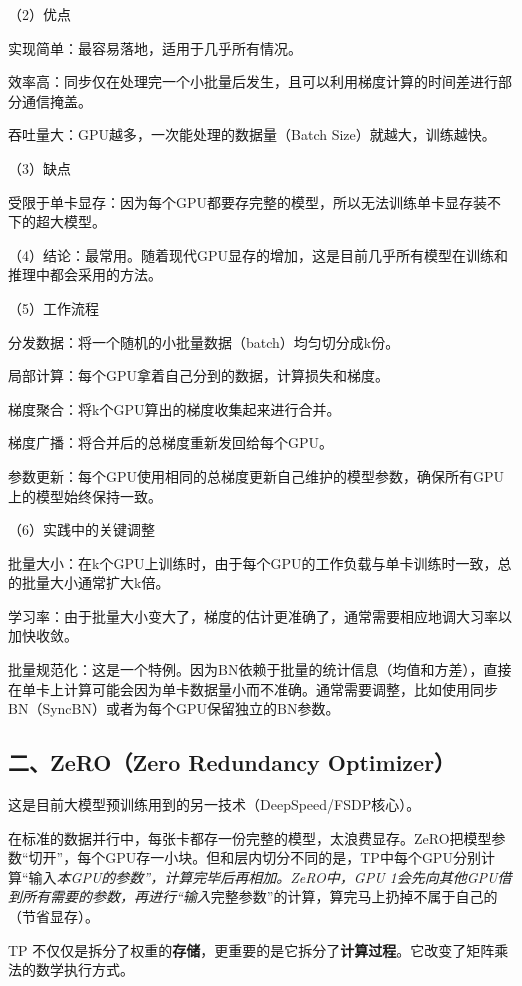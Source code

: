 （2）优点

实现简单：最容易落地，适用于几乎所有情况。

效率高：同步仅在处理完一个小批量后发生，且可以利用梯度计算的时间差进行部分通信掩盖。

吞吐量大：GPU越多，一次能处理的数据量（Batch Size）就越大，训练越快。

（3）缺点

受限于单卡显存：因为每个GPU都要存完整的模型，所以无法训练单卡显存装不下的超大模型。

（4）结论：最常用。随着现代GPU显存的增加，这是目前几乎所有模型在训练和推理中都会采用的方法。

（5）工作流程

分发数据：将一个随机的小批量数据（batch）均匀切分成k份。

局部计算：每个GPU拿着自己分到的数据，计算损失和梯度。

梯度聚合：将k个GPU算出的梯度收集起来进行合并。

梯度广播：将合并后的总梯度重新发回给每个GPU。

参数更新：每个GPU使用相同的总梯度更新自己维护的模型参数，确保所有GPU上的模型始终保持一致。

（6）实践中的关键调整

批量大小：在k个GPU上训练时，由于每个GPU的工作负载与单卡训练时一致，总的批量大小通常扩大k倍。

学习率：由于批量大小变大了，梯度的估计更准确了，通常需要相应地调大习率以加快收敛。

批量规范化：这是一个特例。因为BN依赖于批量的统计信息（均值和方差），直接在单卡上计算可能会因为单卡数据量小而不准确。通常需要调整，比如使用同步BN（SyncBN）或者为每个GPU保留独立的BN参数。

\hypertarget{ux4e8czerozero-redundancy-optimizer}{%
\subsection{二、ZeRO（Zero Redundancy Optimizer）}\label{ux4e8czerozero-redundancy-optimizer}}

这是目前大模型预训练用到的另一技术（DeepSpeed/FSDP核心）。

在标准的数据并行中，每张卡都存一份完整的模型，太浪费显存。ZeRO把模型参数``切开''，每个GPU存一小块。但和层内切分不同的是，TP中每个GPU分别计算``输入\emph{本GPU的参数''，计算完毕后再相加。ZeRO中，GPU 1会先向其他GPU借到所有需要的参数，再进行``输入}完整参数''的计算，算完马上扔掉不属于自己的（节省显存）。

TP 不仅仅是拆分了权重的\textbf{存储}，更重要的是它拆分了\textbf{计算过程}。它改变了矩阵乘法的数学执行方式。

